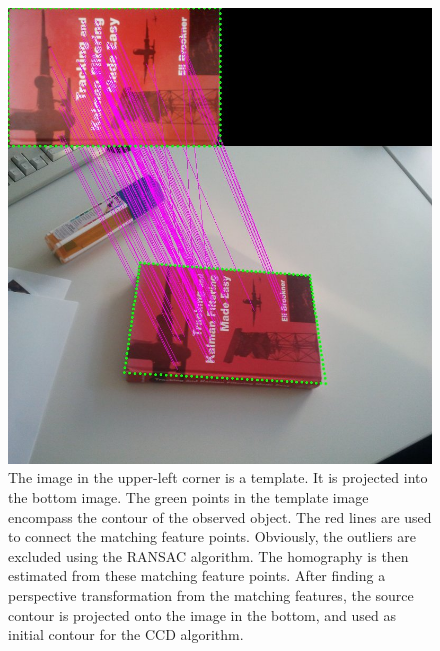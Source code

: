 \begin{figure}[htbp]
  \centering
\includegraphics[width=\linewidth]{images/sift.jpg}
\caption[Contour initialization using the SIFT algorithm]{The image in
  the upper-left corner is a template. It is projected into the bottom
  image. The green points in the template image encompass the
  contour of the observed object. The red lines are used to connect the matching feature
  points. Obviously, the outliers are excluded using the RANSAC
  algorithm. The homography is then estimated from these matching
  feature points.  After finding a perspective
  transformation from the matching features, the source contour is
  projected onto the image in the bottom, and used as initial contour
  for the CCD algorithm.}
\label{fig:sift}
\end{figure}

